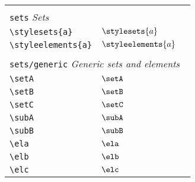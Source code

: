 \begin{longtable}{lll}
  &                            &                                                         \\
  \multicolumn{3}{l}{{\color[rgb]{0.5,0.5,0.5}\texttt{sets}} \emph{Sets}} \\
  \hline
  \hline
  {\color[rgb]{0.5,0.5,0.5}\texttt{\textbackslash stylesets\{a\}}}                                          & $\stylesets{a}$
  & \\
  {\color[rgb]{0.5,0.5,0.5}\texttt{\textbackslash styleelements\{a\}}}                                      & $\styleelements{a}$
  &
  \\
  &                            &                                                         \\
  \multicolumn{3}{l}{{\color[rgb]{0.5,0.5,0.5}\texttt{sets/generic}} \emph{Generic sets and elements}}
  \\
  \hline
  {\color[rgb]{0.5,0.5,0.5}\texttt{\textbackslash setA}}                                                    & $\setA$                    & \\
  {\color[rgb]{0.5,0.5,0.5}\texttt{\textbackslash setB}}                                                    & $\setB$                    & \\
  {\color[rgb]{0.5,0.5,0.5}\texttt{\textbackslash setC}}                                                    & $\setC$                    & \\
  {\color[rgb]{0.5,0.5,0.5}\texttt{\textbackslash subA}}                                                    & $\subA$                    & \\
  {\color[rgb]{0.5,0.5,0.5}\texttt{\textbackslash subB}}                                                    & $\subB$                    & \\
  {\color[rgb]{0.5,0.5,0.5}\texttt{\textbackslash ela}}                                                     & $\ela$                     & \\
  {\color[rgb]{0.5,0.5,0.5}\texttt{\textbackslash elb}}                                                     & $\elb$                     & \\
  {\color[rgb]{0.5,0.5,0.5}\texttt{\textbackslash elc}}                                                     & $\elc$                     & \\

\end{longtable}
